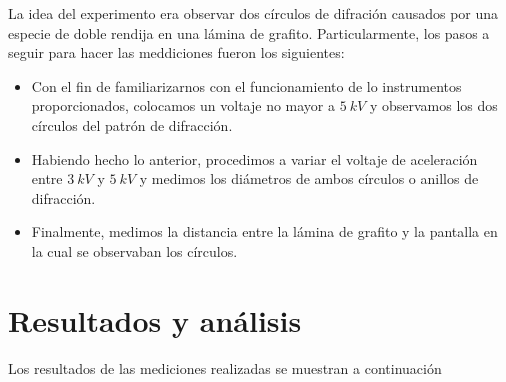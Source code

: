 \documentclass[prb,aps,twocolumn,preprintnumbers,amsmath,amssymb]{revtex4}
\begin{document}
La idea del experimento era observar dos círculos de difración causados por una especie de doble rendija en una lámina de grafito. Particularmente, los pasos a seguir para hacer las meddiciones fueron los siguientes:

\begin{itemize}
	\item Con el fin de familiarizarnos con el funcionamiento de lo instrumentos proporcionados, colocamos un voltaje no mayor a $5\ kV$ y observamos los dos círculos del patrón de difracción. 
	
	\item Habiendo hecho lo anterior, procedimos a variar el voltaje de aceleración entre $3\ kV$ y $5\ kV$ y medimos los diámetros de ambos círculos o anillos de difracción.
	
	\item Finalmente, medimos la distancia entre la lámina de grafito y la pantalla en la cual se observaban los círculos.
\end{itemize}

\section{Resultados y análisis}

Los resultados de las mediciones realizadas se muestran a continuación
\end{document}
